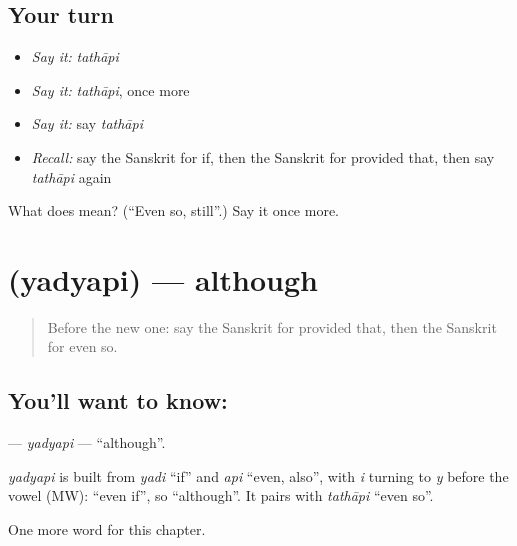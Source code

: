 \subsection*{Your turn}
\begin{itemize}
\raggedright
  \item \emph{Say it:} \emph{tathāpi}
  \item \emph{Say it:} \emph{tathāpi}, once more
  \item \emph{Say it:} say \emph{tathāpi}
  \item \emph{Recall:} say the Sanskrit for if, then the Sanskrit for provided that, then say \emph{tathāpi} again
\end{itemize}

\begin{tcolorbox}[breakable,colback=teal!4,colframe=teal!35!black,title={Before you move on}]
What does  mean? (\textquotedblleft{}Even so, still\textquotedblright{}.) Say it once more.
\end{tcolorbox}
\section[\texorpdfstring{\sk{यद्यपि} (yadyapi)}{यद्यपि (yadyapi)}]{ (yadyapi) — although}

\label{lesson:SA-C154-yadyapi}



\begin{quote}
Before the new one: say the Sanskrit for provided that, then the Sanskrit for even so.
\end{quote}

\subsection*{You'll want to know: }
\textbf{} — \emph{yadyapi} — \textquotedblleft{}although\textquotedblright{}.

\begin{cousinweb}
\emph{yadyapi} is built from \emph{yadi} \textquotedblleft{}if\textquotedblright{} and \emph{api} \textquotedblleft{}even, also\textquotedblright{}, with \emph{i} turning to \emph{y} before the vowel (MW): \textquotedblleft{}even if\textquotedblright{}, so \textquotedblleft{}although\textquotedblright{}. It pairs with \emph{tathāpi} \textquotedblleft{}even so\textquotedblright{}.
\end{cousinweb}

\begin{grammarlens}[title={What you've built}]
One more word for this chapter.
\end{grammarlens}

